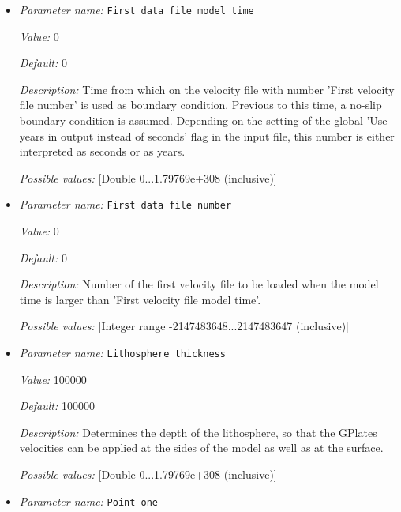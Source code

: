 \begin{itemize}
{\it Possible values:} [Bool]
\item {\it Parameter name:} {\tt First data file model time}
\label{parameters:Boundary velocity model/GPlates model/First data file model time}


{\it Value:} 0


{\it Default:} 0


{\it Description:} Time from which on the velocity file with number 'First velocity file number' is used as boundary condition. Previous to this time, a no-slip boundary condition is assumed. Depending on the setting of the global 'Use years in output instead of seconds' flag in the input file, this number is either interpreted as seconds or as years.


{\it Possible values:} [Double 0...1.79769e+308 (inclusive)]
\item {\it Parameter name:} {\tt First data file number}
\label{parameters:Boundary velocity model/GPlates model/First data file number}


{\it Value:} 0


{\it Default:} 0


{\it Description:} Number of the first velocity file to be loaded when the model time is larger than 'First velocity file model time'.


{\it Possible values:} [Integer range -2147483648...2147483647 (inclusive)]
\item {\it Parameter name:} {\tt Lithosphere thickness}
\label{parameters:Boundary velocity model/GPlates model/Lithosphere thickness}


{\it Value:} 100000


{\it Default:} 100000


{\it Description:} Determines the depth of the lithosphere, so that the GPlates velocities can be applied at the sides of the model as well as at the surface.


{\it Possible values:} [Double 0...1.79769e+308 (inclusive)]
\item {\it Parameter name:} {\tt Point one}
\label{parameters:Boundary velocity model/GPlates model/Point one}



\end{itemize}
